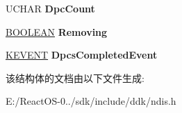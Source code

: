 \begin{DoxyCompactItemize}
U\+C\+H\+AR {\bfseries Dpc\+Count}
\item 
\mbox{\label{struct___n_d_i_s___i_n_t_e_r_r_u_p_t_a04da4e9d3771310370bb16355ef72102}} 
\hyperlink{_processor_bind_8h_a112e3146cb38b6ee95e64d85842e380a}{B\+O\+O\+L\+E\+AN} {\bfseries Removing}
\item 
\mbox{\label{struct___n_d_i_s___i_n_t_e_r_r_u_p_t_ae186bdcb215dacacfe27f9b9a48a4702}} 
\hyperlink{struct___k_e_v_e_n_t}{K\+E\+V\+E\+NT} {\bfseries Dpcs\+Completed\+Event}
\end{DoxyCompactItemize}


该结构体的文档由以下文件生成\+:\begin{DoxyCompactItemize}
\item 
E\+:/\+React\+O\+S-\/0../sdk/include/ddk/ndis.\+h\end{DoxyCompactItemize}
